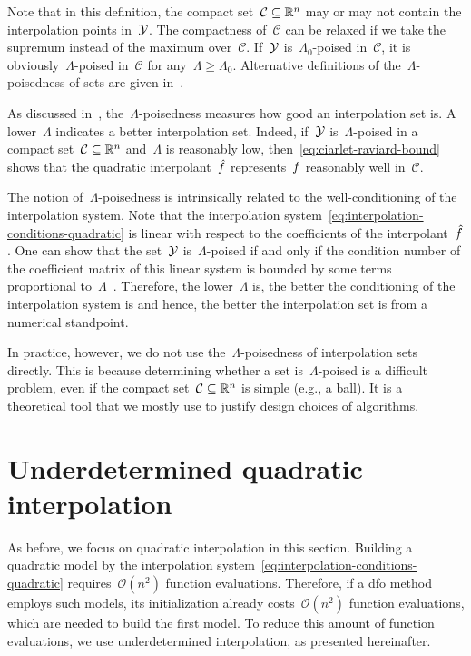 Note that in this definition, the compact set~$\mathcal{C} \subseteq \mathbb{R}^n$ may or may not contain the interpolation points in~$\xpt$.
The compactness of~$\mathcal{C}$ can be relaxed if we take the supremum instead of the maximum over~$\mathcal{C}$.
If~$\xpt$ is~$\Lambda_0$-poised in~$\mathcal{C}$, it is obviously~$\Lambda$-poised in~$\mathcal{C}$ for any~$\Lambda \ge \Lambda_0$.
Alternative definitions of the~$\Lambda$-poisedness of sets are given in~\cite[\S~3.3]{Conn_Scheinberg_Vicente_2009b}.

As discussed in~\cite[\S~3.3]{Conn_Scheinberg_Vicente_2009b}, the~$\Lambda$-poisedness measures how good an interpolation set is.
A lower~$\Lambda$ indicates a better interpolation set.
Indeed, if~$\xpt$ is~$\Lambda$-poised in a compact set~$\mathcal{C} \subseteq \mathbb{R}^n$ and~$\Lambda$ is reasonably low, then~\cref{eq:ciarlet-raviard-bound} shows that the quadratic interpolant~$\objm$ represents~$f$ reasonably well in~$\mathcal{C}$.

The notion of~$\Lambda$-poisedness is intrinsically related to the well-conditioning of the interpolation system.
Note that the interpolation system~\cref{eq:interpolation-conditions-quadratic} is linear with respect to the coefficients of the interpolant~$\objm$.
One can show that the set~$\xpt$ is~$\Lambda$-poised if and only if the condition number of the coefficient matrix of this linear system is bounded by some terms proportional to~$\Lambda$~\cite[Thm.~3.14]{Conn_Scheinberg_Vicente_2009b}.
Therefore, the lower~$\Lambda$ is, the better the conditioning of the interpolation system is and hence, the better the interpolation set is from a numerical standpoint.

In practice, however, we do not use the~$\Lambda$-poisedness of interpolation sets directly.
This is because determining whether a set is~$\Lambda$-poised is a difficult problem, even if the compact set~$\mathcal{C} \subseteq \mathbb{R}^n$ is simple (e.g., a ball).
It is a theoretical tool that we mostly use to justify design choices of algorithms.

\section{Underdetermined quadratic interpolation}
\label{sec:underdetermined-interpolation}

As before, we focus on quadratic interpolation in this section.
Building a quadratic model by the interpolation system~\cref{eq:interpolation-conditions-quadratic} requires~$\mathcal{O}(n^2)$ function evaluations.
Therefore, if a \gls{dfo} method employs such models, its initialization already costs~$\mathcal{O}(n^2)$ function evaluations, which are needed to build the first model.
To reduce this amount of function evaluations, we use underdetermined interpolation, as presented hereinafter.

